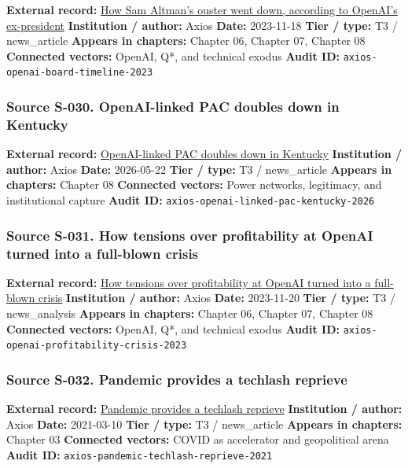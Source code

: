 \documentclass[
  american,
  11pt,
  letterpaper,
]{article}
\begin{document}
\textbf{External record:}
\href{https://www.axios.com/2023/11/18/sam-altman-greg-brockman-openai-board-timeline}{How
Sam Altman's ouster went down, according to OpenAI's ex-president}
\textbf{Institution / author:} Axios \textbf{Date:} 2023-11-18
\textbf{Tier / type:} T3 / news\_article \textbf{Appears in chapters:}
Chapter 06, Chapter 07, Chapter 08 \textbf{Connected vectors:} OpenAI,
Q*, and technical exodus \textbf{Audit ID:}
\texttt{axios-openai-board-timeline-2023}

\subsubsection{Source S-030. OpenAI-linked PAC doubles down in
Kentucky}\label{source-s-030-openai-linked-pac-doubles-down-in-kentucky}

\textbf{External record:}
\href{https://www.axios.com/2026/05/22/open-ai-pac-kentucky}{OpenAI-linked
PAC doubles down in Kentucky} \textbf{Institution / author:} Axios
\textbf{Date:} 2026-05-22 \textbf{Tier / type:} T3 / news\_article
\textbf{Appears in chapters:} Chapter 08 \textbf{Connected vectors:}
Power networks, legitimacy, and institutional capture \textbf{Audit ID:}
\texttt{axios-openai-linked-pac-kentucky-2026}

\subsubsection{Source S-031. How tensions over profitability at OpenAI
turned into a full-blown
crisis}\label{source-s-031-how-tensions-over-profitability-at-openai-turned-into-a-full-blown-crisis}

\textbf{External record:}
\href{https://www.axios.com/2023/11/20/openai-sam-altman-emmett-shear-ceo-nonprofit}{How
tensions over profitability at OpenAI turned into a full-blown crisis}
\textbf{Institution / author:} Axios \textbf{Date:} 2023-11-20
\textbf{Tier / type:} T3 / news\_analysis \textbf{Appears in chapters:}
Chapter 06, Chapter 07, Chapter 08 \textbf{Connected vectors:} OpenAI,
Q*, and technical exodus \textbf{Audit ID:}
\texttt{axios-openai-profitability-crisis-2023}

\subsubsection{Source S-032. Pandemic provides a techlash
reprieve}\label{source-s-032-pandemic-provides-a-techlash-reprieve}

\textbf{External record:}
\href{https://www.axios.com/2021/03/10/pandemic-provides-techlash-reprieve}{Pandemic
provides a techlash reprieve} \textbf{Institution / author:} Axios
\textbf{Date:} 2021-03-10 \textbf{Tier / type:} T3 / news\_article
\textbf{Appears in chapters:} Chapter 03 \textbf{Connected vectors:}
COVID as accelerator and geopolitical arena \textbf{Audit ID:}
\texttt{axios-pandemic-techlash-reprieve-2021}
\end{document}
